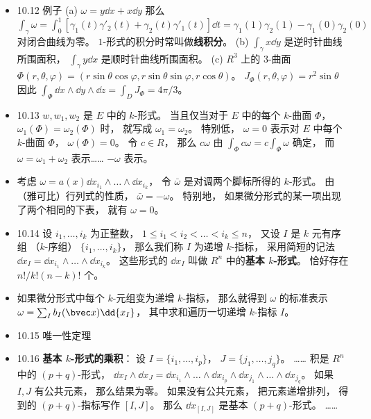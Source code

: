 \begin{itemize}
\item 10.12 例子 (a) $\omega=y\dd{x}+x\dd{y}$ 那么 $\int_\gamma \omega = \int_0^1 [\gamma_1(t)\gamma'_2(t)+\gamma_2(t)\gamma'_1(t)]\dd{t} = \gamma_1(1)\gamma_2(1)-\gamma_1(0)\gamma_2(0)$ 对闭合曲线为零。 $1$-形式的积分时常叫做\textbf{线积分}。 (b) $\int_\gamma x\dd{y}$ 是逆时针曲线所围面积， $\int_\gamma y\dd{x}$ 是顺时针曲线所围面积。 (c) $R^3$ 上的 $3$-曲面 $\Phi(r,\theta,\varphi)=(r\sin\theta\cos\varphi,r\sin\theta\sin\varphi, r\cos\theta)$。 $J_\Phi(r,\theta,\varphi) = r^2\sin\theta$ 因此 $\int_\Phi \dd{x}\wedge\dd{y}\wedge\dd{z} = \int_D J_\Phi = 4\pi/3$。

\item 10.13 $w,w_1,w_2$ 是 $E$ 中的 $k$-形式。 当且仅当对于 $E$ 中的每个 $k$-曲面 $\Phi$， $\omega_1(\Phi)=\omega_2(\Phi)$ 时， 就写成 $\omega_1 =\omega_2$。 特别低， $\omega=0$ 表示对 $E$ 中每个 $k$-曲面 $\Phi$， $\omega(\Phi)=0$。 令 $c\in R$， 那么 $c\omega$ 由 $\int_\Phi c\omega=c\int_\Phi \omega$ 确定， 而 $\omega = \omega_1+\omega_2$ 表示…… $-\omega$ 表示。

\item 考虑 $\omega=a(x)\dd{x_{i_1}}\wedge\dots\wedge \dd{x_{i_k}}$， 令 $\bar\omega$ 是对调两个脚标所得的 $k$-形式。 由（雅可比）行列式的性质， $\bar\omega=-\omega$。 特别地， 如果微分形式的某一项出现了两个相同的下表， 就有 $\omega=0$。

\item 10.14 设 $i_1,\dots,i_k$ 为正整数， $1\leqslant i_1<i_2<\dots<i_k\leqslant n$， 又设 $I$ 是 $k$ 元有序组 （$k$-序组） $\{i_1,\dots,i_k\}$， 那么我们称 $I$ 为递增 $k$-指标， 采用简短的记法 $\dd{x_I}=\dd{x_{i_1}}\wedge\dots\wedge\dd{x_{i_k}}$。 这些形式的 $\dd{x_I}$ 叫做 $R^n$ 中的\textbf{基本 $k$-形式}。 恰好存在 $n!/k!(n-k)!$ 个。

\item 如果微分形式中每个 $k$-元组变为递增 $k$-指标， 那么就得到 $\omega$ 的标准表示 $\omega=\sum_I b_I(\bvec x)\dd{x_I}$， 其中求和遍历一切递增 $k$-指标 $I$。

\item 10.15 唯一性定理

\item 10.16 \textbf{基本 $k$-形式的乘积}： 设 $I=\{i_1,\dots,i_p\}$， $J=\{j_1,\dots,j_q\}$。 …… 积是 $R^n$ 中的 $(p+q)$-形式， $\dd{x_I}\wedge \dd{x_J} = \dd{x_{i_1}} \wedge \dots \wedge \dd{x_{i_p}} \wedge \dd{x_{j_1}}\wedge \dots \wedge \dd{x_{j_q}}$。 如果 $I,J$ 有公共元素， 那么结果为零。 如果没有公共元素， 把元素递增排列， 得到的 $(p+q)$-指标写作 $[I,J]$。 那么 $\dd{x_{[I,J]}}$ 是基本 $(p+q)$-形式。 ……


\end{itemize}
